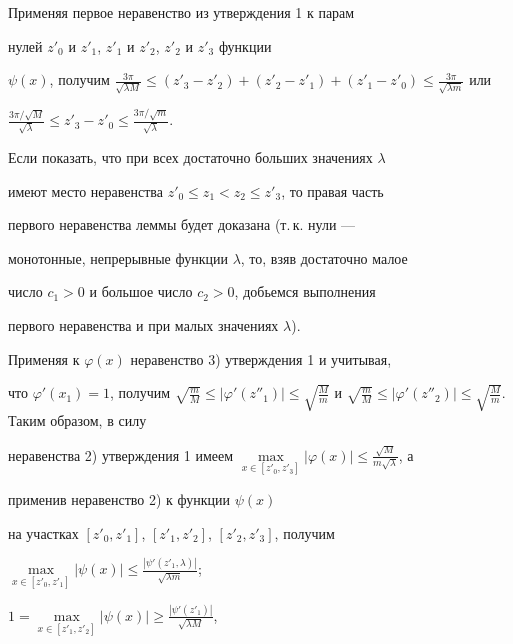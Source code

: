 \begin{pf}
 


Применяя первое неравенство из утверждения 1 к парам 


нулей $z'_0$ и $z'_1$, $z'_1$ и $z'_2$, $z'_2$ и $z'_3$ функции 


$\psi(x)$, получим $\frac{3\pi}{\sqrt{\lambda M}}\le (z'_3-z'_2)+ 


(z'_2-z'_1)+ (z'_1-z'_0)\le \frac{3\pi}{\sqrt{\lambda m}}$ или 


$\frac{3\pi/\sqrt{M}}{\sqrt{\lambda}}\le z'_3-z'_0\le 


\frac{3\pi/\sqrt{m}}{\sqrt{\lambda}}$. 


 


Если показать, что при всех достаточно больших значениях $\lambda$ 


имеют место неравенства $z'_0\le z_1<z_2\le z'_3$, то правая часть 


первого неравенства леммы будет доказана (т.\,к. нули --- 


монотонные, непрерывные функции $\lambda$, то, взяв достаточно малое 


число $c_1>0$ и большое число $c_2>0$, добьемся выполнения 


первого неравенства и при малых значениях $\lambda$). 


 


Применяя к $\varphi(x)$ неравенство 3) утверждения 1 и учитывая, 


что $\varphi'(x_1)=1$, получим $\sqrt{\frac{m}{M}}\le 


|\varphi'(z''_1)|\le \sqrt{\frac{M}{m}}$ и $\sqrt{\frac{m}{M}}\le 


|\varphi'(z''_2)|\le\sqrt{\frac{M}{m}}$. Таким образом, в силу 


неравенства 2) утверждения 1 имеем $\max\limits_{x\in[z'_0,z'_3]} 


|\varphi(x)|\le\frac{\sqrt{M}}{m\sqrt{\lambda}}$, а 


применив неравенство 2) к функции $\psi(x)$ 


на участках $[z'_0,z'_1]$, $[z'_1,z'_2]$, $[z'_2,z'_3]$, получим 


$\max\limits_{x\in[z'_0,z'_1]} |\psi(x)|\le 


\frac{|\psi'(z'_1,\lambda)|}{\sqrt{\lambda m}}$; 


$1=\max\limits_{x\in[z'_1,z'_2]} |\psi(x)|\ge 


\frac{|\psi'(z'_1)|}{\sqrt{\lambda M}}$, 



\end{pf}
